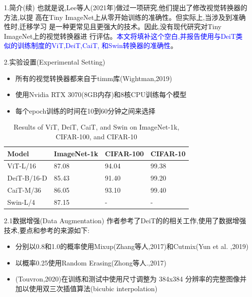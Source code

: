 \documentclass[UTF8]{ctexbeamer}
\begin{document}
\begin{frame}{1.简介(续)}
  \kaishu   
  也就是说,Lee等人(2021年)做过一项研究,他们提出了修改视觉转换器的方法,以提
  高在Tiny ImageNet上从零开始训练的准确性。但实际上,当涉及到准确性时,迁移学习
  是一种更常见且更强大的技术。因此,没有现代研究对Tiny ImageNet上的视觉转换器进
  行评估。\textcolor{blue}{本文将填补这个空白,并报告使用与DeiT类似的训练制度的ViT,DeiT,CaiT,
  和Swin转换器的准确性}。
\end{frame}

\begin{frame}{2.实验设置(Experimental Setting)}
  \begin{itemize}
    \item 所有的视觉转换器都来自于timm库(Wightman,2019)
    \item 使用Nvidia RTX 3070(8GB内存)和8核CPU训练每个模型
    \item 每个epoch训练的时间在10到60分钟之间来选择
  \end{itemize}
  \begin{table}[h]
    \centering
    \begin{tabular}{|l|l|l|l|}
    \hline
    Model & ImageNet-1k & CIFAR-100 & CIFAR-10 \\
    \hline
    ViT-L/16 & 87.08 & 94.04 & 99.38 \\
    DeiT-B/16-D & 85.43 & 91.40 & 99.20 \\
    CaiT-M/36 & 86.05 & 93.10 & 99.40 \\
    Swin-L/4 & 87.15 & - & - \\
    \hline
    \end{tabular}
    \caption{Results of ViT, DeiT, CaiT, and Swin on ImageNet-1k, 
    CIFAR-100, and CIFAR-10}
    \end{table}
\end{frame}

\begin{frame}{2.1数据增强(Data Augmentation)}
  作者参考了DeiT的的相关工作,使用了数据增强技术,要点和参考的来源如下:
  \begin{itemize}
    \item 分别以0.8和1.0的概率使用Mixup(Zhang等人,2017)和Cutmix(Yun et al.
    ,2019)
    \item 以概率0.25使用Random Erasing(Zhong等人.,2017)
    \item (Touvron,2020)在训练和测试中使用尺寸调整为 384x384 分辨率的完整图像并
    加以使用双三次插值算法(bicubic interpolation)
  \end{itemize}
\end{frame}
\end{document}
